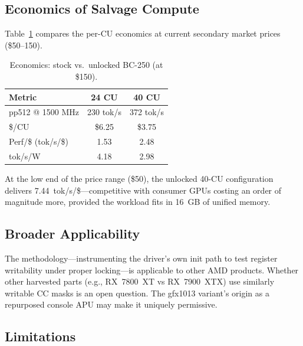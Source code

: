 \documentclass[11pt,twocolumn]{article}
\begin{document}
\subsection{Economics of Salvage Compute}

Table~\ref{tab:economics} compares the per-CU economics at current secondary market prices (\$50--150).

\begin{table}[H]
\centering
\caption{Economics: stock vs.\ unlocked BC-250 (at \$150).}
\label{tab:economics}
\small
\begin{tabular}{@{}lcc@{}}
\toprule
\textbf{Metric} & \textbf{24 CU} & \textbf{40 CU} \\
\midrule
pp512 @ 1500 MHz & 230 tok/s & 372 tok/s \\
\$/CU & \$6.25 & \$3.75 \\
Perf/\$ (tok/s/\$) & 1.53 & 2.48 \\
tok/s/W & 4.18 & 2.98 \\
\bottomrule
\end{tabular}
\end{table}

At the low end of the price range (\$50), the unlocked 40-CU configuration delivers 7.44~tok/s/\$---competitive with consumer GPUs costing an order of magnitude more, provided the workload fits in 16~GB of unified memory.

\subsection{Broader Applicability}

The methodology---instrumenting the driver's own init path to test register writability under proper locking---is applicable to other AMD products. Whether other harvested parts (e.g., RX~7800~XT vs RX~7900~XTX) use similarly writable CC masks is an open question. The gfx1013 variant's origin as a repurposed console APU may make it uniquely permissive.

\subsection{Limitations}
\end{document}

